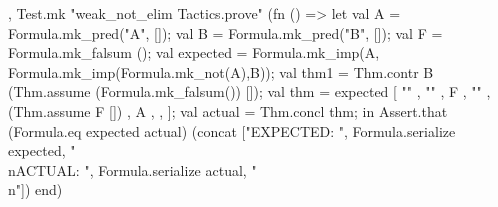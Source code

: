 \nwenddocs{}\plusendmoddef\nwstartdeflinemarkup{}\nwenddeflinemarkup
, Test.mk "weak_not_elim Tactics.prove" (fn () =>
    let
      val A = Formula.mk_pred("A", []);
      val B = Formula.mk_pred("B", []);
      val F = Formula.mk_falsum ();
      val expected = Formula.mk_imp(A,
                                    Formula.mk_imp(Formula.mk_not(A),B));
      val thm1 = Thm.contr B (Thm.assume (Formula.mk_falsum()) []);
      val thm =  expected
                             [  ""
                             ,  ""
                             ,  F
                             ,  ""
                             ,  (Thm.assume F [])
                             ,  A
                             , 
                             ,  ];
      val actual = Thm.concl thm;
    in
      Assert.that (Formula.eq expected actual)
                  (concat ["EXPECTED: ",
                           Formula.serialize expected,
                           "\\nACTUAL: ",
                           Formula.serialize actual,
                           "\\n"])
    end)
